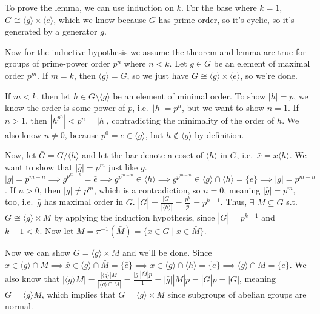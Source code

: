 \documentclass[fleqn]{article}
\begin{document}
        To prove the lemma, we can use induction on $k$.  For the base where $k = 1$, $G \cong \langle g \rangle \times \langle e \rangle$, which we know because $G$ has prime order, so it's cyclic, so it's generated by a generator $g$.
        
        Now for the inductive hypothesis we assume the theorem and lemma are true for groups of prime-power order $p^n$ where $n < k$.  Let $g \in G$ be an element of maximal order $p^m$.  If $m = k$, then $\langle g \rangle = G$, so we just have $G \cong \langle g \rangle \times \langle e \rangle$, so we're done.
        
        If $m < k$, then let $h \in G \setminus \langle g \rangle$ be an element of minimal order.  To show $|h| = p$, we know the order is some power of $p$, i.e.\ $|h| = p^n$, but we want to show $n = 1$.  If $n > 1$, then $|h^{p^n}| < p^n = |h|$, contradicting the minimality of the order of $h$.  We also know $n \neq 0$, because $p^0 = e \in \langle g \rangle$, but $h \notin \langle g \rangle$ by definition.
        
        Now, let $\bar{G} = G/\langle h \rangle$ and let the bar denote a coset of $\langle h \rangle$ in $G$, i.e.\ $\bar{x} = x \langle h \rangle$.  We want to show that $|\bar{g}| = p^m$ just like $g$.  $|\bar{g}| = p^{m - n} \implies \bar{g}^{p^{m - n}} = \bar{e} \implies g^{p^{m - n}} \in \langle h \rangle \implies g^{p^{m - n}} \in \langle g \rangle \cap \langle h \rangle = \{e\} \implies |g| = p^{m - n}$.  If $n > 0$, then $|g| \neq p^m$, which is a contradiction, so $n = 0$, meaning $|\bar{g}| = p^m$, too, i.e.\ $\bar{g}$ has maximal order in $\bar{G}$.  $|\bar{G}| = \frac{|G|}{|\langle h \rangle|} = \frac{p^k}{p} = p^{k - 1}$.  Thus, $\exists$ $\bar{M} \subseteq \bar{G}$ s.t.\ $\bar{G} \cong \langle \bar{g} \rangle \times \bar{M}$ by applying the induction hypothesis, since $|\bar{G}| = p^{k - 1}$ and $k - 1 < k$.  Now let $M = \pi^{-1}(\bar{M}) = \{x \in G \mid \bar{x} \in \bar{M}\}$.
        
        Now we can show $G = \langle g \rangle \times M$ and we'll be done.  Since $x \in \langle g \rangle \cap M \implies \bar{x} \in \langle \bar{g} \rangle \cap \bar{M} = \{\bar{e}\} \implies x \in \langle g \rangle \cap \langle h \rangle = \{e\} \implies \langle g \rangle \cap M = \{e\}$.  We also know that $|\langle g \rangle M| = \frac{|\langle g \rangle |M|}{|\langle g \rangle \cap M|} = \frac{|g| |\bar{M}| p}{1} = |\bar{g}| |\bar{M}| p = |\bar{G}| p = |G|$, meaning $G = \langle g \rangle M$, which implies that $G = \langle g \rangle \times M$ since subgroups of abelian groups are normal.
        
\end{document}
